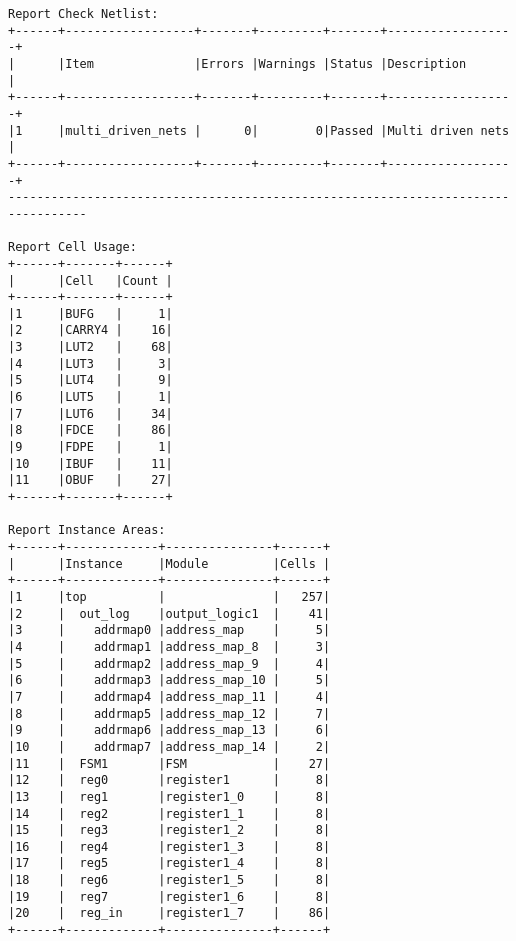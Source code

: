 \documentclass [a4paper, 12pt]{article}
\begin{document}
\begin{lstlisting}[breaklines, basicstyle=\tiny]
Report Check Netlist: 
+------+------------------+-------+---------+-------+------------------+
|      |Item              |Errors |Warnings |Status |Description       |
+------+------------------+-------+---------+-------+------------------+
|1     |multi_driven_nets |      0|        0|Passed |Multi driven nets |
+------+------------------+-------+---------+-------+------------------+
---------------------------------------------------------------------------------

Report Cell Usage: 
+------+-------+------+
|      |Cell   |Count |
+------+-------+------+
|1     |BUFG   |     1|
|2     |CARRY4 |    16|
|3     |LUT2   |    68|
|4     |LUT3   |     3|
|5     |LUT4   |     9|
|6     |LUT5   |     1|
|7     |LUT6   |    34|
|8     |FDCE   |    86|
|9     |FDPE   |     1|
|10    |IBUF   |    11|
|11    |OBUF   |    27|
+------+-------+------+

Report Instance Areas: 
+------+-------------+---------------+------+
|      |Instance     |Module         |Cells |
+------+-------------+---------------+------+
|1     |top          |               |   257|
|2     |  out_log    |output_logic1  |    41|
|3     |    addrmap0 |address_map    |     5|
|4     |    addrmap1 |address_map_8  |     3|
|5     |    addrmap2 |address_map_9  |     4|
|6     |    addrmap3 |address_map_10 |     5|
|7     |    addrmap4 |address_map_11 |     4|
|8     |    addrmap5 |address_map_12 |     7|
|9     |    addrmap6 |address_map_13 |     6|
|10    |    addrmap7 |address_map_14 |     2|
|11    |  FSM1       |FSM            |    27|
|12    |  reg0       |register1      |     8|
|13    |  reg1       |register1_0    |     8|
|14    |  reg2       |register1_1    |     8|
|15    |  reg3       |register1_2    |     8|
|16    |  reg4       |register1_3    |     8|
|17    |  reg5       |register1_4    |     8|
|18    |  reg6       |register1_5    |     8|
|19    |  reg7       |register1_6    |     8|
|20    |  reg_in     |register1_7    |    86|
+------+-------------+---------------+------+

\end{lstlisting}
\restoregeometry



\end{document}
